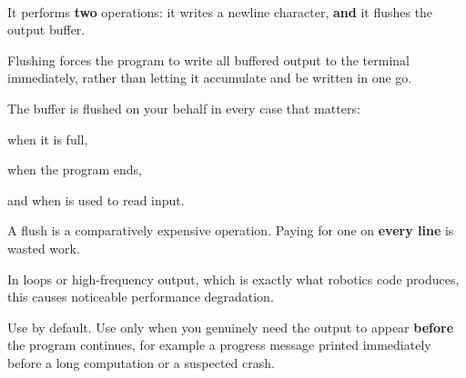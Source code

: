 \documentclass[
    10pt,
    dvipsnames,
    svgnames,
    x11names,
    aspectratio=1610,
    english,
    codeminted]{beamer}
\begin{document}
\begin{frame}[fragile]{\secname}
\framesubtitle{\subsecname}
\begin{compactitem}
\small
    \item It performs \textbf{two} operations: it writes a newline character, \textbf{and} it flushes the output buffer.
    \item Flushing forces the program to write all buffered output to the terminal immediately, rather than letting it accumulate and be written in one go.
\end{compactitem}

\medskip
{}
The buffer is flushed on your behalf in every case that matters:
\begin{compactitem}
\small
    \item when it is full,
    \item when the program ends,
    \item and when  is used to read input.
\end{compactitem}

\medskip
{}
\begin{compactitem}
\small
    \item A flush is a comparatively expensive operation. Paying for one on \textbf{every line} is wasted work.
    \item In loops or high-frequency output, which is exactly what robotics code produces, this causes noticeable performance degradation.
\end{compactitem}

\medskip
\begin{MyBox}
Use  by default. Use  only when you genuinely need the output to appear \textbf{before} the program continues, for example a progress message printed immediately before a long computation or a suspected crash.
\end{MyBox}
\end{frame}

\end{document}
